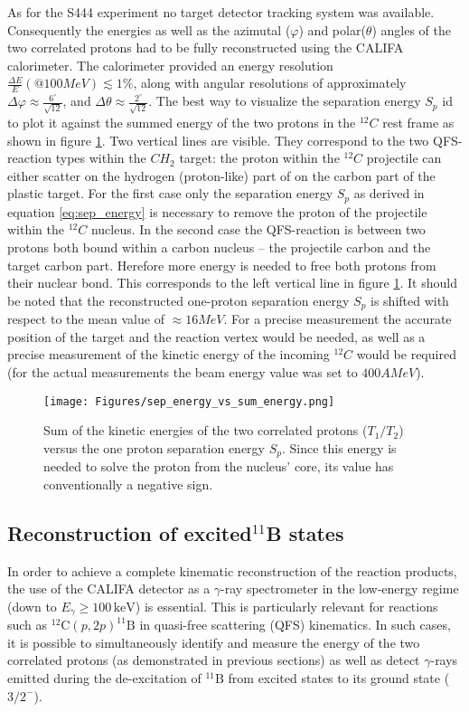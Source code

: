 As for the S444 experiment no target detector tracking system was available. Consequently the energies as well as the azimutal ($\varphi$) and polar($\theta$) angles of the two correlated protons had to be fully reconstructed using the CALIFA calorimeter. The calorimeter provided an energy resolution $\frac{\Delta E}{E}(@100MeV) \lesssim 1 \%$, along with angular resolutions of approximately  $\Delta \varphi \approx \frac{6^{\circ}}{\sqrt{12}}$, and $\Delta \theta \approx \frac{2^{\circ}}{\sqrt{12}}$.
The best way to visualize the separation energy $S_p$ id to plot it against the summed energy of the two protons in the $^{12}C$ rest frame as shown in figure \ref{fig:sep_energy}. Two vertical lines are visible. They correspond to the two QFS-reaction types within the $CH_2$ target: the proton within the $^{12}C$ projectile can either scatter on the hydrogen (proton-like) part of on the carbon part of the plastic target. For the first case only the separation energy $S_p$ as derived in equation \ref{eq:sep_energy} is necessary to remove the proton of the projectile within the $^{12}C$ nucleus. In the second case the QFS-reaction is between two protons both bound within a carbon nucleus -- the projectile carbon and the target carbon part. Herefore more energy is needed to free both protons from their nuclear bond. This corresponds to the left vertical line in figure \ref{fig:sep_energy}. It should be noted that the reconstructed one-proton separation energy $S_p$ is shifted with respect to the mean value of $\approx 16 MeV$. For a precise measurement the accurate position of the target and the reaction vertex would be needed, as well as a precise measurement of the kinetic energy of the incoming $^{12}C$ would be required (for the actual measurements the beam energy value was set to $400 AMeV$). 
\begin{figure}[htpb]
    \centering
    \texttt{[image: Figures/sep\_energy\_vs\_sum\_energy.png]}
    \caption{
	Sum of the kinetic energies of the two correlated protons ($T_1/T_2$) versus the one proton separation energy $S_p$. Since this energy is needed to solve the proton from the nucleus' core, its value has conventionally a negative sign.  	 
    }
    \label{fig:sep_energy}
\end{figure}

\subsection{Reconstruction of excited$ ^{11}$B states}
In order to achieve a complete kinematic reconstruction of the reaction products, the use of the CALIFA detector as a $\gamma$-ray spectrometer in the low-energy regime (down to $E_\gamma \geq 100\,\mathrm{keV}$) is essential. This is particularly relevant for reactions such as $^{12}\mathrm{C}(p,2p)^{11}\mathrm{B}$ in quasi-free scattering (QFS) kinematics. In such cases, it is possible to simultaneously identify and measure the energy of the two correlated protons (as demonstrated in previous sections) as well as detect $\gamma$-rays emitted during the de-excitation of $^{11}\mathrm{B}$ from excited states to its ground state ($3/2^-$).

